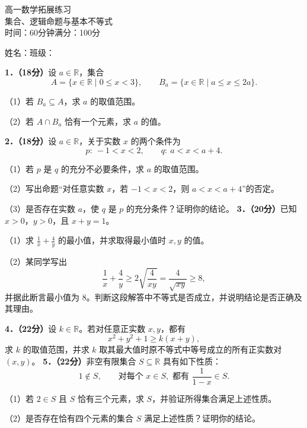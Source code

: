 \documentclass[UTF8,a4paper,12pt]{ctexart}
\newcommand{\subq}[1]{\par\Needspace{3\baselineskip}（#1）}
\begin{document}
\begin{center}{\LARGE 高一数学拓展练习}\\[6pt]集合、逻辑命题与基本不等式\\[4pt]时间：60分钟\qquad 满分：100分\end{center}
姓名：\underline{\hspace{3cm}}\qquad 班级：\underline{\hspace{3cm}}

\textbf{1．（18分）}设 $a\in\mathbb R$，集合
\[A=\{x\in\mathbb R\mid 0\le x<3\},\qquad B_a=\{x\in\mathbb R\mid a\le x\le 2a\}.\]
\subq{1}若 $B_a\subseteq A$，求 $a$ 的取值范围。
\subq{2}若 $A\cap B_a$ 恰有一个元素，求 $a$ 的值。
\vspace*{3cm}

\textbf{2．（18分）}设 $a\in\mathbb R$，关于实数 $x$ 的两个条件为
\[p:\ -1<x<2,\qquad q:\ a<x<a+4.\]
\subq{1}若 $p$ 是 $q$ 的充分不必要条件，求 $a$ 的取值范围。
\subq{2}写出命题“对任意实数 $x$，若 $-1<x<2$，则 $a<x<a+4$”的否定。
\subq{3}是否存在实数 $a$，使 $q$ 是 $p$ 的充分条件？证明你的结论。
\vspace*{3cm}
\newpage
\textbf{3．（20分）}已知 $x>0$，$y>0$，且 $x+y=1$。
\subq{1}求 $\displaystyle\frac1x+\frac4y$ 的最小值，并求取得最小值时 $x,y$ 的值。
\subq{2}某同学写出
\[\frac1x+\frac4y\ge 2\sqrt{\frac4{xy}}=\frac4{\sqrt{xy}}\ge 8,\]
并据此断言最小值为 $8$。判断这段解答中不等式是否成立，并说明结论是否正确及其理由。
\vspace*{4cm}

\textbf{4．（22分）}设 $k\in\mathbb R$。若对任意正实数 $x,y$，都有
\[x^2+y^2+1\ge k(x+y),\]
求 $k$ 的取值范围，并求 $k$ 取其最大值时原不等式中等号成立的所有正实数对 $(x,y)$。
\vspace*{5cm}
\newpage
\textbf{5．（22分）}非空有限集合 $S\subseteq\mathbb R$ 具有如下性质：
\[1\notin S,\qquad \text{对每个 }x\in S,\text{ 都有 }\frac1{1-x}\in S.\]
\subq{1}若 $2\in S$ 且 $S$ 恰有三个元素，求 $S$，并验证所得集合满足上述性质。
\subq{2}是否存在恰有四个元素的集合 $S$ 满足上述性质？证明你的结论。
\vspace*{9cm}
\end{document}
